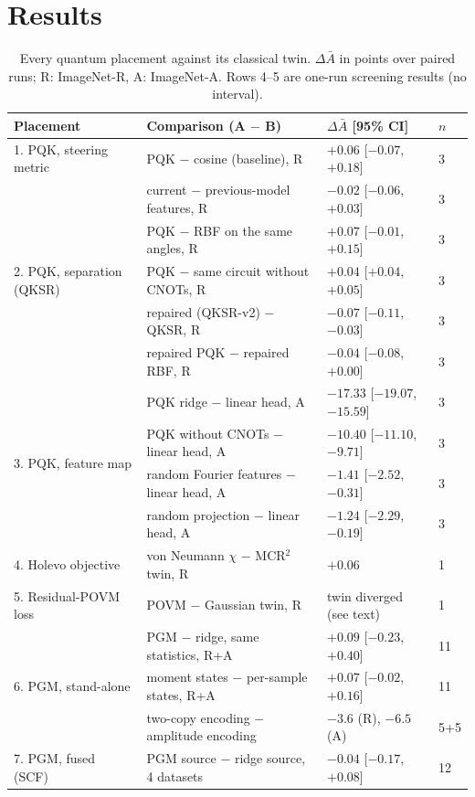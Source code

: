 \section{Results}
\label{sec:results}

\begin{table}[t]
\centering
\small
\setlength{\tabcolsep}{3.5pt}
\begin{tabular}{llll}
\toprule
Placement & Comparison (A $-$ B) & $\Delta\bar A$ [95\% CI] & $n$ \\
\midrule
1. PQK, steering metric & PQK $-$ cosine (baseline), R & $+0.06$ [$-0.07$, $+0.18$] & 3 \\
\midrule
\multirow{5}{*}{2. PQK, separation (QKSR)} & current $-$ previous-model features, R & $-0.02$ [$-0.06$, $+0.03$] & 3 \\
 & PQK $-$ RBF on the same angles, R & $+0.07$ [$-0.01$, $+0.15$] & 3 \\
 & PQK $-$ same circuit without CNOTs, R & $+0.04$ [$+0.04$, $+0.05$] & 3 \\
 & repaired (QKSR-v2) $-$ QKSR, R & $-0.07$ [$-0.11$, $-0.03$] & 3 \\
 & repaired PQK $-$ repaired RBF, R & $-0.04$ [$-0.08$, $+0.00$] & 3 \\
\midrule
\multirow{4}{*}{3. PQK, feature map} & PQK ridge $-$ linear head, A & $-17.33$ [$-19.07$, $-15.59$] & 3 \\
 & PQK without CNOTs $-$ linear head, A & $-10.40$ [$-11.10$, $-9.71$] & 3 \\
 & random Fourier features $-$ linear head, A & $-1.41$ [$-2.52$, $-0.31$] & 3 \\
 & random projection $-$ linear head, A & $-1.24$ [$-2.29$, $-0.19$] & 3 \\
\midrule
4. Holevo objective & von Neumann $\chi$ $-$ MCR$^2$ twin, R & $+0.06$ & 1 \\
5. Residual-POVM loss & POVM $-$ Gaussian twin, R & twin diverged (see text) & 1 \\
\midrule
\multirow{3}{*}{6. PGM, stand-alone} & PGM $-$ ridge, same statistics, R+A & $+0.09$ [$-0.23$, $+0.40$] & 11 \\
 & moment states $-$ per-sample states, R+A & $+0.07$ [$-0.02$, $+0.16$] & 11 \\
 & two-copy encoding $-$ amplitude encoding & $-3.6$ (R), $-6.5$ (A) & 5+5 \\
7. PGM, fused (SCF) & PGM source $-$ ridge source, 4 datasets & $-0.04$ [$-0.17$, $+0.08$] & 12 \\
\bottomrule
\end{tabular}
\caption{Every quantum placement against its classical twin. $\Delta\bar A$ in
points over paired runs; R: ImageNet-R, A: ImageNet-A. Rows 4--5 are one-run
screening results (no interval).}
\label{tab:quantum}
\end{table}

